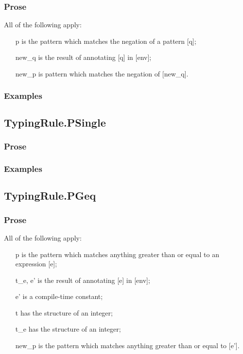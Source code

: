 \documentclass{book}
\begin{document}
    \subsubsection{Prose}
    All of the following apply:
   \begin{itemize}
   \item [p] is the pattern which matches the negation of a pattern [q];
   \item [new\_q] is the result of annotating [q] in [env]; 
   \item [new\_p] is pattern which matches the negation of [new\_q].
   \end{itemize}

    \subsubsection{Examples}

\subsection{TypingRule.PSingle}

    \subsubsection{Prose}

    \subsubsection{Examples}

\subsection{TypingRule.PGeq}

    \subsubsection{Prose}
    All of the following apply:
   \begin{itemize}
   \item [p] is the pattern which matches anything greater than or equal to an expression [e];
   \item [t\_e, e'] is the result of annotating [e] in [env]; 
   \item [e'] is a compile-time constant;
   \item [t] has the structure of an integer;
   \item [t\_e] has the structure of an integer;
   \item [new\_p] is the pattern which matches anything greater than or equal to [e'].
   \end{itemize}
\end{document}

